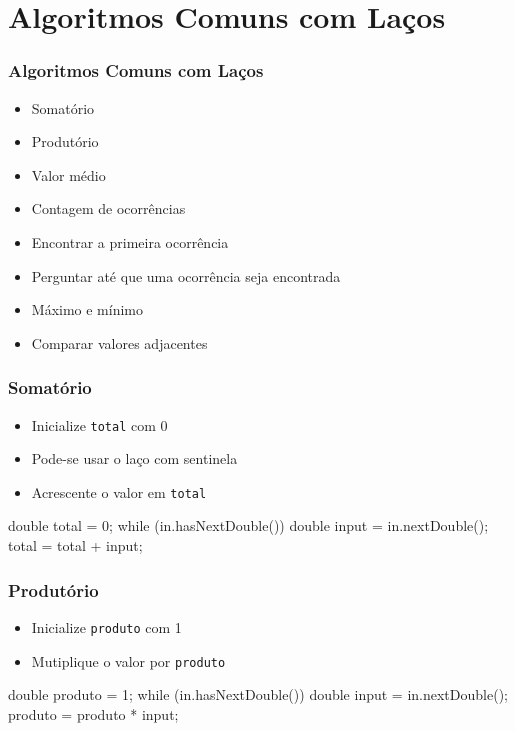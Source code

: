 \documentclass[xcolor={dvipsnames,table},aspectratio=169]{beamer}
\begin{document}
\section{Algoritmos Comuns com Laços}

\begin{frame}\frametitle{Algoritmos Comuns com Laços}
\begin{itemize}
	\item Somatório
	\item Produtório
	\item Valor médio
	\item Contagem de ocorrências
	\item Encontrar a primeira ocorrência
	\item Perguntar até que uma ocorrência seja encontrada
	\item Máximo e mínimo
	\item Comparar valores adjacentes
\end{itemize}
\end{frame}

\begin{frame}[fragile]\frametitle{Somatório}
\begin{itemize}
	\item Inicialize \texttt{total} com 0
	\item Pode-se usar o laço com sentinela
	\item Acrescente o valor em \texttt{total}
\end{itemize}
\begin{javacode}
double total = 0;
while (in.hasNextDouble()) {
   double input = in.nextDouble();
   total = total + input;
}
\end{javacode}
\end{frame}

\begin{frame}[fragile]\frametitle{Produtório}
\begin{itemize}
	\item Inicialize \texttt{produto} com 1
	\item Mutiplique o valor por \texttt{produto}
\end{itemize}
\begin{javacode}
double produto = 1;
while (in.hasNextDouble()) {
   double input = in.nextDouble();
   produto = produto * input;
}
\end{javacode}
\end{frame}
\end{document}

